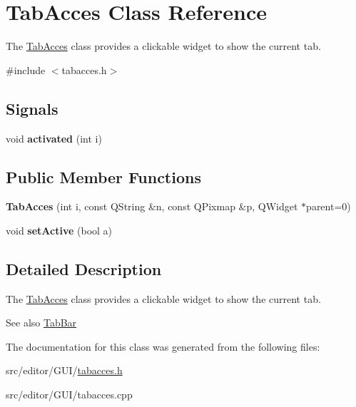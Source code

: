 \hypertarget{class_tab_acces}{\section{\-Tab\-Acces \-Class \-Reference}
\label{class_tab_acces}
}


\-The \hyperlink{class_tab_acces}{\-Tab\-Acces} class provides a clickable widget to show the current tab.  




{\ttfamily \#include $<$tabacces.\-h$>$}

\subsection*{\-Signals}
\begin{DoxyCompactItemize}
\item 
\hypertarget{class_tab_acces_a3a44992ceb2227664fce84ed26ae226c}{void {\bfseries activated} (int i)}\label{class_tab_acces_a3a44992ceb2227664fce84ed26ae226c}

\end{DoxyCompactItemize}
\subsection*{\-Public \-Member \-Functions}
\begin{DoxyCompactItemize}
\item 
\hypertarget{class_tab_acces_a0e6bcf25a31952e09517ce2273f81786}{{\bfseries \-Tab\-Acces} (int i, const \-Q\-String \&n, const \-Q\-Pixmap \&p, \-Q\-Widget $\ast$parent=0)}\label{class_tab_acces_a0e6bcf25a31952e09517ce2273f81786}

\item 
\hypertarget{class_tab_acces_a2b5298cbcbd0e7e880d7418dea03aa53}{void {\bfseries set\-Active} (bool a)}\label{class_tab_acces_a2b5298cbcbd0e7e880d7418dea03aa53}

\end{DoxyCompactItemize}


\subsection{\-Detailed \-Description}
\-The \hyperlink{class_tab_acces}{\-Tab\-Acces} class provides a clickable widget to show the current tab. 

\begin{DoxySeeAlso}{\-See also}
\hyperlink{class_tab_bar}{\-Tab\-Bar} 
\end{DoxySeeAlso}


\-The documentation for this class was generated from the following files\-:\begin{DoxyCompactItemize}
\item 
src/editor/\-G\-U\-I/\hyperlink{tabacces_8h}{tabacces.\-h}\item 
src/editor/\-G\-U\-I/tabacces.\-cpp\end{DoxyCompactItemize}
